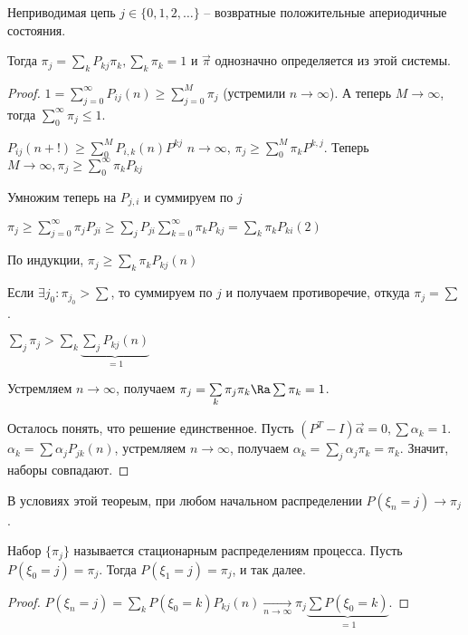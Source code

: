 \begin{theorem}
Неприводимая цепь $j \in \{0, 1, 2, \dots \}$ -- возвратные положительные апериодичные состояния.

Тогда $\pi_j = \sum\limits_k P_{kj} \pi_k, \sum\limits_k \pi_k = 1$ и $\overrightarrow{\pi}$ однозначно определяется из этой системы.
\end{theorem}
\begin{proof}
$1 = \sum\limits_{j=0}^\infty P_{ij}(n) \geq \sum\limits_{j=0}^M \pi_j$ (устремили $n \to \infty$). 
А теперь $M \to \infty$, тогда $\sum\limits_0^\infty \pi_j \leq 1$.

$P_{ij} (n + !) \geq \sum\limits_0^M P_{i,k}(n)P^{kj}$ $n \to \infty$, $\pi_j \geq \sum\limits_0^M \pi_k P^{k, j}$. Теперь $M \to \infty, \pi_j \geq \sum\limits_0^\infty \pi_k P_{kj}$

Умножим теперь на $P_{j,i}$ и суммируем по $j$

$\pi_j \geq \sum\limits_{j=0}^\infty \pi_j P_{ji} \geq \sum\limits_j P_{ji} \sum\limits_{k=0}^\infty \pi_k P_{kj} = \sum\limits_k \pi_k P_{ki}(2)$

По индукции, $\pi_j \geq \sum\limits_k \pi_k P_{kj}(n)$

Если $\exists j_0 \colon \pi_{j_0} > \sum$, то суммируем по $j$ и получаем противоречие, откуда $\pi_j = \sum$.

$\sum\limits_j \pi_j > \sum\limits_k  \underbrace{\sum\limits_j P_{kj}(n)}_{=1}$

Устремляем $n \to \infty$, получаем $\pi_j = \sum\limits_k \pi_j \pi_k \Ra \sum \pi_k = 1$.


Осталось понять, что решение единственное. 
Пусть $(P^T - I) \overrightarrow{\alpha} = 0, \sum \alpha_k = 1$.
$\alpha_k = \sum\alpha_j P_{jk}(n)$, устремляем $n \to \infty$, получаем $\alpha_k = \sum_j \alpha_j \pi_k = \pi_k$.
Значит, наборы совпадают.
\end{proof}

\begin{conseq}
В условиях этой теореым, при любом начальном распределении $P(\xi_n = j) \to \pi_j$.

Набор $\{\pi_j\}$ называется стационарным распределениям процесса. Пусть $P(\xi_0 = j) = \pi_j$. Тогда $P(\xi_1 = j) = \pi_j$, и так далее.
\end{conseq}
\begin{proof}
$P(\xi_n = j) = \sum\limits_k P(\xi_0 = k) P_{kj}(n) \xrightarrow[n \to \infty]{} \pi_j \underbrace{\sum P(\xi_0 = k)}_{=1}$.
\end{proof}



